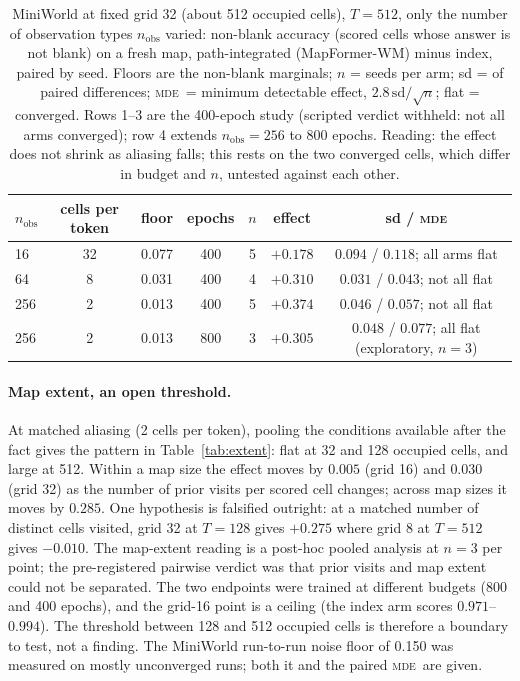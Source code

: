 \documentclass[10pt]{article}
\newcommand{\mde}{\textsc{mde}}
\begin{document}
\begin{table}[t]
\centering
\small
\captionsetup{font=footnotesize,skip=4pt}
\caption{MiniWorld at fixed grid 32 (about 512 occupied cells), $T=512$, only the number of observation types $n_{\mathrm{obs}}$ varied: non-blank accuracy (scored cells whose answer is not blank) on a fresh map, path-integrated (MapFormer-WM) minus index, paired by seed. Floors are the non-blank marginals; $n$ = seeds per arm; sd = of paired differences; \mde\ = minimum detectable effect, $2.8\,\mathrm{sd}/\sqrt{n}$; flat = converged. Rows 1--3 are the 400-epoch study (scripted verdict withheld: not all arms converged); row 4 extends $n_{\mathrm{obs}}=256$ to 800 epochs. Reading: the effect does not shrink as aliasing falls; this rests on the two converged cells, which differ in budget and $n$, untested against each other.}
\label{tab:alias}
\begin{tabular}{@{}lcccccc@{}}
\toprule
$n_{\mathrm{obs}}$ & cells per token & floor & epochs & $n$ & effect & sd / \mde \\
\midrule
16  & 32 & 0.077 & 400 & 5 & $+0.178$ & $0.094$ / $0.118$; all arms flat \\
64  & 8  & 0.031 & 400 & 4 & $+0.310$ & $0.031$ / $0.043$; not all flat \\
256 & 2  & 0.013 & 400 & 5 & $+0.374$ & $0.046$ / $0.057$; not all flat \\
256 & 2  & 0.013 & 800 & 3 & $+0.305$ & $0.048$ / $0.077$; all flat (exploratory, $n=3$) \\
\bottomrule
\end{tabular}
\end{table}

\paragraph{Map extent, an open threshold.} At matched aliasing (2 cells per token), pooling the
conditions available after the fact gives the pattern in Table~\ref{tab:extent}: flat at 32 and 128
occupied cells, and large at 512. Within a map size the effect moves by $0.005$ (grid 16) and $0.030$
(grid 32) as the number of prior visits per scored cell changes; across map sizes it moves by $0.285$.
One hypothesis is falsified outright: at a matched number of distinct cells visited, grid 32 at $T=128$
gives $+0.275$ where grid 8 at $T=512$ gives $-0.010$. The map-extent reading is a post-hoc pooled
analysis at $n=3$ per point; the pre-registered pairwise verdict was that prior visits and map extent
could not be separated. The two endpoints were trained at different budgets (800 and 400 epochs), and
the grid-16 point is a ceiling (the index arm scores $0.971$--$0.994$). The threshold between 128 and
512 occupied cells is therefore a boundary to test, not a finding. The MiniWorld run-to-run noise
floor of 0.150 was measured on mostly unconverged runs; both it and the paired \mde\ are given.
\end{document}
